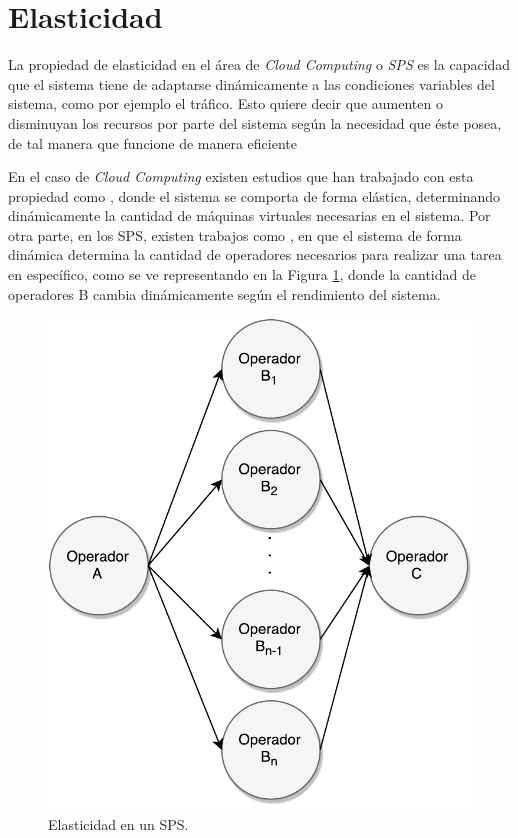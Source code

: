 \section{Elasticidad}
\label{sec:elasticidad}

La propiedad de elasticidad en el \'area de \textit{Cloud Computing} o \textit{SPS} es la capacidad que el sistema tiene de adaptarse din\'amicamente a las condiciones variables del sistema, como por ejemplo el tr\'afico. \normalsize{Esto quiere decir que aumenten o disminuyan los recursos por parte del sistema seg\'un la necesidad que \'este posea, de tal manera que funcione de manera eficiente} \citep{kelly2014elasticity}

En el caso de \textit{Cloud Computing} existen estudios que han trabajado con esta propiedad como \citep{GongGW10, NguyenSGSW13, LehrigEB15}, donde el sistema se comporta de forma el\'astica, determinando din\'amicamente la cantidad de m\'aquinas virtuales necesarias en el sistema. Por otra parte, en los SPS, existen trabajos como \citep{GedikSHW14, IshiiS11, SchneiderAGBW09, MadsenTZ14, GulisanoJPSV12}, en que el sistema de forma din\'amica determina la cantidad de operadores necesarios para realizar una tarea en espec\'ifico, como se ve representando en la Figura \ref{fig:elasticidad}, donde la cantidad de operadores B cambia din\'amicamente seg\'un el rendimiento del sistema.

\begin{figure}[!ht]
	\centering
	\includegraphics[scale=0.55]{images/Elasticidad.pdf}
	\caption{Elasticidad en un SPS.}
	\label{fig:elasticidad}
\end{figure}

